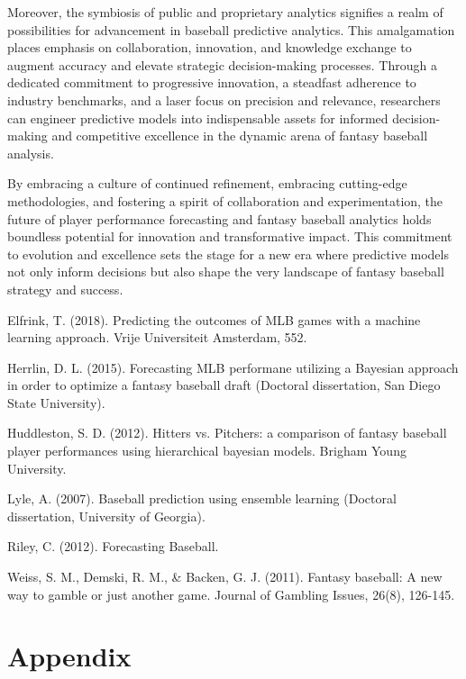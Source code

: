 \documentclass[12pt, english]{article}
\begin{document}
Moreover, the symbiosis of public and proprietary analytics signifies a realm of possibilities for advancement in baseball predictive analytics. This amalgamation places emphasis on collaboration, innovation, and knowledge exchange to augment accuracy and elevate strategic decision-making processes. Through a dedicated commitment to progressive innovation, a steadfast adherence to industry benchmarks, and a laser focus on precision and relevance, researchers can engineer predictive models into indispensable assets for informed decision-making and competitive excellence in the dynamic arena of fantasy baseball analysis.


By embracing a culture of continued refinement, embracing cutting-edge methodologies, and fostering a spirit of collaboration and experimentation, the future of player performance forecasting and fantasy baseball analytics holds boundless potential for innovation and transformative impact. This commitment to evolution and excellence sets the stage for a new era where predictive models not only inform decisions but also shape the very landscape of fantasy baseball strategy and success.

\vfill{}
\pagebreak{}




Elfrink, T. (2018). Predicting the outcomes of MLB games with a machine learning approach. Vrije Universiteit Amsterdam, 552.

Herrlin, D. L. (2015). Forecasting MLB performane utilizing a Bayesian approach in order to optimize a fantasy baseball draft (Doctoral dissertation, San Diego State University).

Huddleston, S. D. (2012). Hitters vs. Pitchers: a comparison of fantasy baseball player performances using hierarchical bayesian models. Brigham Young University.

Lyle, A. (2007). Baseball prediction using ensemble learning (Doctoral dissertation, University of Georgia).

Riley, C. (2012). Forecasting Baseball.

Weiss, S. M., Demski, R. M., & Backen, G. J. (2011). Fantasy baseball: A new way to gamble or just another game. Journal of Gambling Issues, 26(8), 126-145.

\vfill{}
\pagebreak{}

\section{Appendix}
\end{document}
